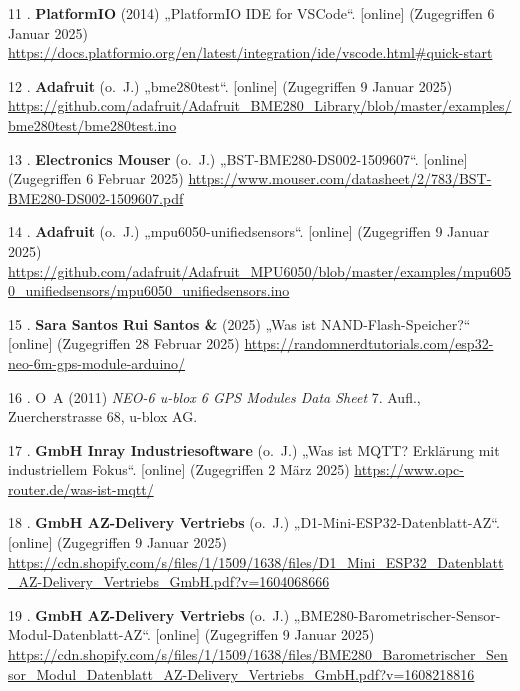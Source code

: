 \documentclass[
    headings=optiontotocandhead,%
    twoside,
    numbers=noenddot,%
    12pt, %
    titlepage, %
    parskip=full, %
    listof=leveldown, 
    numbers=noenddot, %
    a4paper,DIV=14,
    BCOR=15mm,
]{scrbook}
\newlength{\cslhangindent}
\newenvironment{cslreferences}%
  {\setlength{\parindent}{0pt}%
  \everypar{\setlength{\hangindent}{\cslhangindent}}\ignorespaces}%
  {\par}
\begin{document}
\begin{cslreferences}
\leavevmode\hypertarget{ref-PlatformIO-firststeps}{}%
11 . \textbf{PlatformIO} (2014) „PlatformIO IDE for VSCode``.
{[}online{]} (Zugegriffen 6 Januar 2025)
\url{https://docs.platformio.org/en/latest/integration/ide/vscode.html\#quick-start}

\leavevmode\hypertarget{ref-BME280-Test}{}%
12 . \textbf{Adafruit} (o.~J.) „bme280test``. {[}online{]} (Zugegriffen
9 Januar 2025)
\url{https://github.com/adafruit/Adafruit_BME280_Library/blob/master/examples/bme280test/bme280test.ino}

\leavevmode\hypertarget{ref-BME280-Datasheet}{}%
13 . \textbf{Electronics Mouser} (o.~J.) „BST-BME280-DS002-1509607``.
{[}online{]} (Zugegriffen 6 Februar 2025)
\url{https://www.mouser.com/datasheet/2/783/BST-BME280-DS002-1509607.pdf}

\leavevmode\hypertarget{ref-MPU6050-Test}{}%
14 . \textbf{Adafruit} (o.~J.) „mpu6050-unifiedsensors``. {[}online{]}
(Zugegriffen 9 Januar 2025)
\url{https://github.com/adafruit/Adafruit_MPU6050/blob/master/examples/mpu6050_unifiedsensors/mpu6050_unifiedsensors.ino}

\leavevmode\hypertarget{ref-GPS-Testprogramm}{}%
15 . \textbf{Sara Santos Rui Santos \&} (2025) „Was ist
NAND-Flash-Speicher?{}`` {[}online{]} (Zugegriffen 28 Februar 2025)
\url{https://randomnerdtutorials.com/esp32-neo-6m-gps-module-arduino/}

\leavevmode\hypertarget{ref-GPS-Baudrate}{}%
16 . O~A (2011) \emph{NEO-6 u-blox 6 GPS Modules Data Sheet} 7. Aufl.,
Zuercherstrasse 68, u-blox AG.

\leavevmode\hypertarget{ref-Inray-GmbH}{}%
17 . \textbf{GmbH Inray Industriesoftware} (o.~J.) „Was ist MQTT?
Erklärung mit industriellem Fokus``. {[}online{]} (Zugegriffen 2 März
2025) \url{https://www.opc-router.de/was-ist-mqtt/}

\leavevmode\hypertarget{ref-ESP32-Datenblatt}{}%
18 . \textbf{GmbH AZ-Delivery Vertriebs} (o.~J.)
„D1-Mini-ESP32-Datenblatt-AZ``. {[}online{]} (Zugegriffen 9 Januar 2025)
\url{https://cdn.shopify.com/s/files/1/1509/1638/files/D1_Mini_ESP32_Datenblatt_AZ-Delivery_Vertriebs_GmbH.pdf?v=1604068666}

\leavevmode\hypertarget{ref-BME280-Datenblatt}{}%
19 . \textbf{GmbH AZ-Delivery Vertriebs} (o.~J.)
„BME280-Barometrischer-Sensor-Modul-Datenblatt-AZ``. {[}online{]}
(Zugegriffen 9 Januar 2025)
\url{https://cdn.shopify.com/s/files/1/1509/1638/files/BME280_Barometrischer_Sensor_Modul_Datenblatt_AZ-Delivery_Vertriebs_GmbH.pdf?v=1608218816}


\end{cslreferences}
\end{document}
